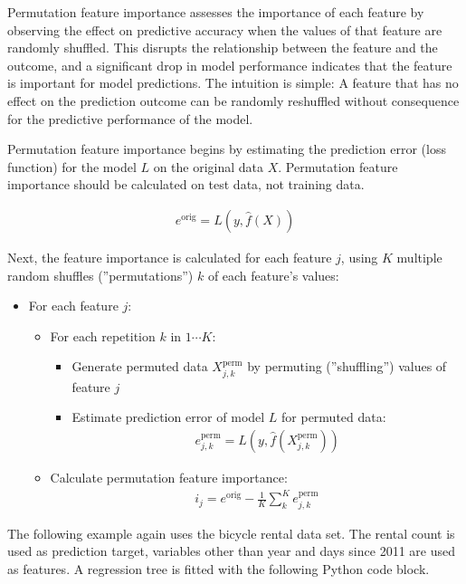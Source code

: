 Permutation feature importance assesses the importance of each feature by observing the effect on predictive accuracy when the values of that feature are randomly shuffled. This disrupts the relationship between the feature and the outcome, and a significant drop in model performance indicates that the feature is important for model predictions. The intuition is simple: A feature that has no effect on the prediction outcome can be randomly reshuffled without consequence for the predictive performance of the model.

Permutation feature importance begins by estimating the prediction error (loss function) for the model $L$ on the original data $X$. Permutation feature importance should be calculated on test data, not training data.

\begin{align*}
e^{\text{orig}} = L(y, \hat{f}(X))
\end{align*}

\begin{samepage}
Next, the feature importance is calculated for each feature $j$, using $K$ multiple random shuffles (''permutations'') $k$ of each feature's values:

\begin{itemize}
\item For each feature $j$:
  \begin{itemize}
     \item For each repetition $k$ in $1 \cdots K$:
     \begin{itemize}
        \item Generate permuted data $X^{\text{perm}}_{j, k}$ by permuting (''shuffling'') values of feature $j$
        \item Estimate prediction error of model $L$ for permuted data:
        \begin{align*}e^{\text{perm}}_{j, k} = L(y, \hat{f}(X^{\text{perm}}_{j, k}))\end{align*}
     \end{itemize}
     \item Calculate permutation feature importance: 
     \begin{align*}i_j = e^{\text{orig}} - \frac{1}{K}\sum_k^K e^{\text{perm}}_{j, k}\end{align*}
  \end{itemize}
\end{itemize}
\end{samepage}

The following example again uses the bicycle rental data set. The rental count is used as prediction target, variables other than year and days since 2011 are used as features. A regression tree is fitted with the following Python code block.

